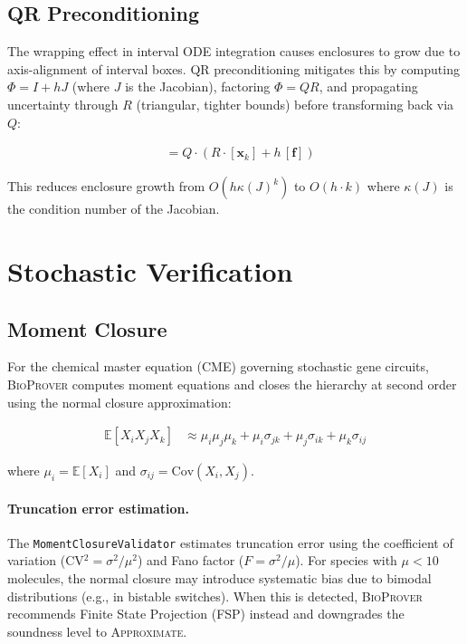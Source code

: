 \documentclass[11pt]{article}
\newcommand{\bioprover}{\textsc{BioProver}}
\begin{document}
\subsection{QR Preconditioning}

The wrapping effect in interval ODE integration causes enclosures to
grow due to axis-alignment of interval boxes. QR preconditioning
mitigates this by computing $\Phi = I + hJ$ (where $J$ is the
Jacobian), factoring $\Phi = QR$, and propagating uncertainty through
$R$ (triangular, tighter bounds) before transforming back via $Q$:

\begin{align}
[\mathbf{x}_{k+1}] &= Q \cdot (R \cdot [\mathbf{x}_k] + h\,[\mathbf{f}])
\end{align}

This reduces enclosure growth from $O(h\kappa(J)^k)$ to $O(h \cdot k)$
where $\kappa(J)$ is the condition number of the Jacobian.

\section{Stochastic Verification}
\label{app:stochastic}

\subsection{Moment Closure}

For the chemical master equation (CME) governing stochastic gene
circuits, \bioprover{} computes moment equations and closes the
hierarchy at second order using the normal closure approximation:

\begin{align}
\mathbb{E}[X_i X_j X_k] &\approx \mu_i \mu_j \mu_k
  + \mu_i \sigma_{jk} + \mu_j \sigma_{ik} + \mu_k \sigma_{ij}
\end{align}

where $\mu_i = \mathbb{E}[X_i]$ and
$\sigma_{ij} = \text{Cov}(X_i, X_j)$.

\paragraph{Truncation error estimation.}
The \texttt{MomentClosureValidator} estimates truncation error using
the coefficient of variation (CV$^2 = \sigma^2/\mu^2$) and Fano
factor ($F = \sigma^2/\mu$). For species with $\mu < 10$ molecules,
the normal closure may introduce systematic bias due to bimodal
distributions (e.g., in bistable switches). When this is detected,
\bioprover{} recommends Finite State Projection (FSP) instead and
downgrades the soundness level to \textsc{Approximate}.
\end{document}
